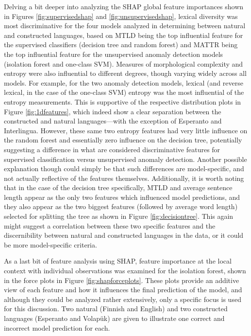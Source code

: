 \documentclass[12pt,a4paper]{article}
\numberwithin{figure}{section}
\numberwithin{table}{section}
\numberwithin{definition}{section}
\begin{document}
Delving a bit deeper into analyzing the SHAP global feature importances shown in Figures \ref{fig:supervisedshap} and \ref{fig:unsupervisedshap}, lexical diversity was most discriminative for the four models analyzed in determining between natural and constructed languages, based on MTLD being the top influential feature for the supervised classifiers (decision tree and random forest) and MATTR being the top influential feature for the unsupervised anomaly detection models (isolation forest and one-class SVM). Measures of morphological complexity and entropy were also influential to different degrees, though varying widely across all models. For example, for the two anomaly detection models, lexical (and reverse lexical, in the case of the one-class SVM) entropy was the most influential of the entropy measurements. This is supportive of the respective distribution plots in Figure \ref{fig:1dfeatures}, which indeed show a clear separation between the constructed and natural languages---with the exception of Esperanto and Interlingua. However, these same two entropy features had very little influence on the random forest and essentially zero influence on the decision tree, potentially suggesting a difference in what are considered discriminative features for supervised classification versus unsupervised anomaly detection. Another possible explanation though could simply be that such differences are model-specific, and not actually reflective of the features themselves. Additionally, it is worth noting that in the case of the decision tree specifically, MTLD and average sentence length appear as the only two features which influenced model predictions, and they also appear as the two biggest features (followed by average word length) selected for splitting the tree as shown in Figure \ref{fig:decisiontree}. This again might suggest a correlation between these two specific features and the discernibility between natural and constructed languages in the data, or it could be more model-specific criteria.

As a last bit of feature analysis using SHAP, feature importance at the local context with individual observations was examined for the isolation forest, shown in the force plots in Figure \ref{fig:shapforceplots}. These plots provide an additive view of each feature and how it influences the final prediction of the model, and although they could be analyzed rather extensively, only a specific focus is used for this discussion. Two natural (Finnish and English) and two constructed languages (Esperanto and Volapük) are given to illustrate one correct and incorrect model prediction for each.
\end{document}
